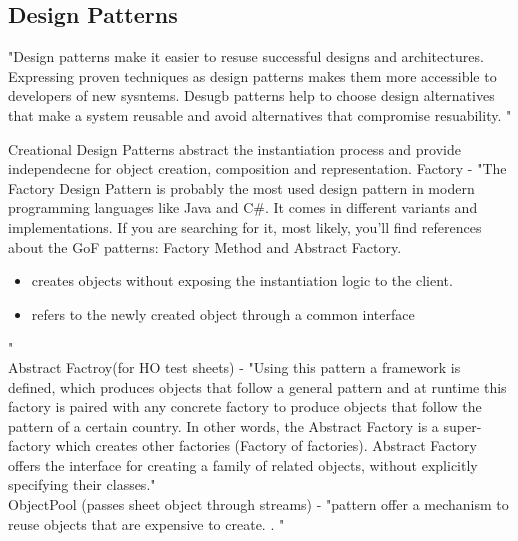 
\subsection{Design Patterns}
"Design patterns make it easier to resuse successful designs and architectures. Expressing proven techniques as design patterns makes them more accessible to developers of new sysntems. Desugb patterns help to choose design alternatives that make a system reusable and avoid alternatives that compromise resuability. "\cite{DesignPatterns}


Creational Design Patterns abstract the instantiation process and provide independecne for object creation, composition and representation. 
Factory - "The Factory Design Pattern is probably the most used design pattern in modern programming languages like Java and C\#. It comes in different variants and implementations. If you are searching for it, most likely, you'll find references about the GoF patterns: Factory Method and Abstract Factory.
\begin{itemize}
\item creates objects without exposing the instantiation logic to the client.
\item refers to the newly created object through a common interface
\end{itemize}"\cite{oosite}\\


Abstract Factroy(for HO test sheets) - "Using this pattern a framework is defined, which produces objects that follow a general pattern and at runtime this factory is paired with any concrete factory to produce objects that follow the pattern of a certain country. In other words, the Abstract Factory is a super-factory which creates other factories (Factory of factories).
Abstract Factory offers the interface for creating a family of related objects, without explicitly specifying their classes."\cite{oosite}\\

ObjectPool (passes sheet object through streams) - "pattern offer a mechanism to reuse objects that are expensive to create. .
"\cite{oosite}\\

